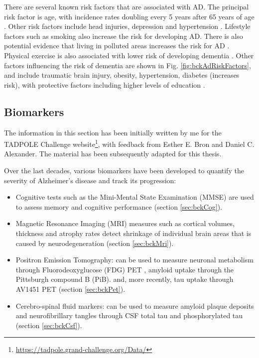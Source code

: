 There are several known risk factors that are associated with AD. The principal risk factor is age, with incidence rates doubling every 5 years after 65 years of age \cite{querfurth2010mechanisms,todd2013survival}. Other risk factors include head injuries, depression and hypertension \cite{Burns2009}. Lifestyle factors such as smoking \cite{cataldo2010cigarette} also increase the risk for developing AD. There is  also potential evidence that living in polluted areas increases the risk for AD \cite{moulton2012air}. Physical exercise is also associated with lower risk of developing dementia \cite{ahlskog2011physical}. Other factors influencing the risk of dementia are shown in Fig. \ref{fig:bckAdRiskFactors}, and include traumatic brain injury, obesity, hypertension, diabetes (increases risk), with protective factors including higher levels of education \cite{baumgart2015summary}.

\subsection{Biomarkers}
\label{sec:bckBio}

The information in this section has been initially written by me for the TADPOLE Challenge website\footnote{\url{https://tadpole.grand-challenge.org/Data/}}, with feedback from Esther E. Bron and Daniel C. Alexander. The material has been subsequently adapted for this thesis. 

Over the last decades, various biomarkers have been developed to quantify the severity of Alzheimer's disease and track its progression:
\begin{itemize}
\item Cognitive tests such as the Mini-Mental State Examination (MMSE) \cite{mckhann1984clinical} are used to assess memory and cognitive performance (section \ref{sec:bckCog}). 
\item Magnetic Resonance Imaging (MRI) measures such as cortical volumes, thickness and atrophy rates detect shrinkage of individual brain areas that is caused by neurodegeneration (section \ref{sec:bckMri}). 
\item Positron Emission Tomography: can be used to measure neuronal metabolism through Fluorodeoxyglucose (FDG) PET \cite{herholz2012use}, amyloid uptake through the Pittsburgh compound B (PiB). \cite{klunk2004imaging} and, more recently, tau uptake through AV1451 PET (section \ref{sec:bckPet}).
\item Cerebro-spinal fluid markers: can be used to measure amyloid plaque deposits \cite{blennow2003csf} and neurofibrillary tangles through CSF total tau and phosphorylated tau \cite{blennow2003csf} (section \ref{sec:bckCsf}).
\end{itemize}

